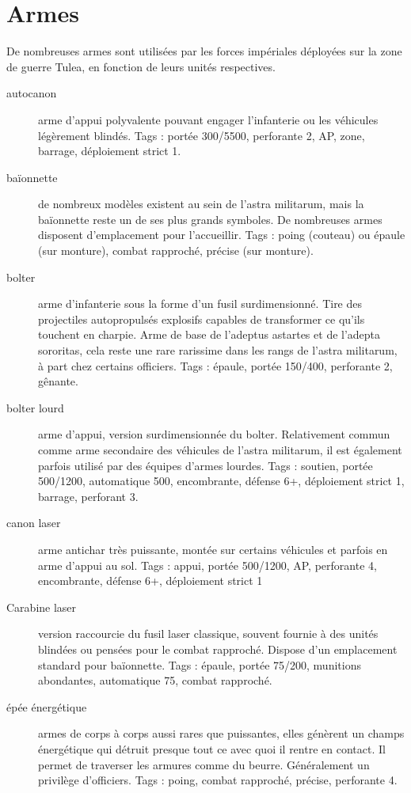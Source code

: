 \documentclass[10pt,a4paper]{article}
\begin{document}
\section{Armes}
De nombreuses armes sont utilisées par les forces impériales déployées sur la zone de guerre Tulea, en fonction de leurs unités respectives.
\begin{description}
\item[autocanon]arme d'appui polyvalente pouvant engager l'infanterie ou les véhicules légèrement blindés. Tags : portée 300/5500, perforante 2, AP, zone, barrage, déploiement strict 1.
\item[baïonnette]de nombreux modèles existent au sein de l'astra militarum, mais la baïonnette reste un de ses plus grands symboles. De nombreuses armes disposent d'emplacement pour l'accueillir. Tags : poing (couteau) ou épaule (sur monture), combat rapproché, précise (sur monture).
\item[bolter ]arme d'infanterie sous la forme d'un fusil surdimensionné. Tire des projectiles autopropulsés explosifs capables de transformer ce qu'ils touchent en charpie. Arme de base de l'adeptus astartes et de l'adepta sororitas, cela reste une rare rarissime dans les rangs de l'astra militarum, à part chez certains officiers. Tags : épaule, portée 150/400, perforante 2, gênante.
\item[bolter lourd]arme d'appui, version surdimensionnée du bolter. Relativement commun comme arme secondaire des véhicules de l'astra militarum, il est également parfois utilisé par des équipes d'armes lourdes. Tags : soutien, portée 500/1200, automatique 500, encombrante, défense 6+, déploiement strict 1, barrage, perforant 3.
\item[canon laser]arme antichar très puissante, montée sur certains véhicules et parfois en arme d'appui au sol. Tags : appui, portée 500/1200, AP, perforante 4, encombrante, défense 6+, déploiement strict 1
\item[Carabine laser] version raccourcie du fusil laser classique, souvent fournie à des unités blindées ou pensées pour le combat rapproché. Dispose d'un emplacement standard pour baïonnette. Tags : épaule, portée 75/200, munitions abondantes, automatique 75, combat rapproché.
\item[épée énergétique]armes de corps à corps aussi rares que puissantes, elles génèrent un champs énergétique qui détruit presque tout ce avec quoi il rentre en contact. Il permet de traverser les armures comme du beurre. Généralement un privilège d'officiers. Tags : poing, combat rapproché, précise, perforante 4.

\end{description}
\end{document}
